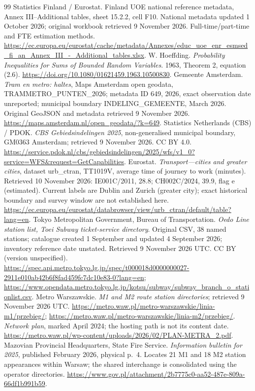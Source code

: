 \begin{thebibliography}{99}
 Statistics Finland / Eurostat. Finland UOE national
reference metadata, Annex III--Additional tables, sheet 15.2.2, cell F10.
National metadata updated 1 October 2026; original workbook retrieved
9 November 2026. Full-time/part-time and FTE estimation methods.
\url{https://ec.europa.eu/eurostat/cache/metadata/Annexes/educ_uoe_enr_esmsed_fi_an_Annex_III_-_Additional_tables.xlsx}.
 W. Hoeffding.
\textit{Probability Inequalities for Sums of Bounded Random Variables}.
1963, Theorem 2, equation (2.6).
\url{https://doi.org/10.1080/01621459.1963.10500830}.
 Gemeente Amsterdam.
\textit{Tram en metro: haltes}, Maps Amsterdam open geodata,
TRAMMETRO\_PUNTEN\_2026; metadata ID 649, 2026, exact observation date unreported; municipal boundary
INDELING\_GEMEENTE, March 2026.
Original GeoJSON and metadata retrieved 9 November 2026.
\url{https://maps.amsterdam.nl/open_geodata/?k=649}.
 Statistics Netherlands (CBS) / PDOK.
\textit{CBS Gebiedsindelingen 2025}, non-generalised municipal boundary,
GM0363 Amsterdam; retrieved 9 November 2026. CC BY 4.0.
\url{https://service.pdok.nl/cbs/gebiedsindelingen/2025/wfs/v1_0?service=WFS&request=GetCapabilities}.
 Eurostat.
\textit{Transport---cities and greater cities}, dataset urb\_ctran,
TT1019V, average time of journey to work (minutes).
Retrieved 10 November 2026: IE001C/2011, 28.8; CH002C/2024, 39.9,
flag e (estimated). Current labels are Dublin and Zurich (greater city);
exact historical boundary and survey window are not established here.
\url{https://ec.europa.eu/eurostat/databrowser/view/urb_ctran/default/table?lang=en}.
 Tokyo Metropolitan Government, Bureau of Transportation.
\textit{Oedo Line station list, Toei Subway ticket-service directory}.
Original CSV, 38 named stations; catalogue created 1 September and updated
4 September 2026; inventory reference date unstated. Retrieved 9 November 2026 UTC.
CC BY (version unspecified).
\url{https://spec.api.metro.tokyo.lg.jp/spec/t000018d0000000027-2911e010ab42b6f8fad459fc7dc10e83-0?lang=en};
\url{https://www.opendata.metro.tokyo.lg.jp/kotsu/subway/subway_branch_o_stationlist.csv}.
 Metro Warszawskie.
\textit{M1 and M2 route station directories}; retrieved 9 November 2026 UTC.
\url{https://metro.waw.pl/metro-warszawskie/linia-m1/przebieg/};
\url{https://metro.waw.pl/metro-warszawskie/linia-m2/przebieg/}.
\textit{Network plan}, marked April 2024; the hosting path is not its content date.
\url{https://metro.waw.pl/wp-content/uploads/2026/02/PLAN-METRA_2.pdf}.
 Mazovian Provincial Headquarters, State Fire Service.
\textit{Information bulletin for 2025}, published February 2026, physical p.~4.
Locates 21 M1 and 18 M2 station appearances within Warsaw; the shared interchange
is consolidated using the operator directories.
\url{https://www.gov.pl/attachment/2b7775c0-aa52-487e-809a-66df1b991b59}.
\end{thebibliography}
